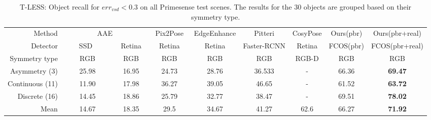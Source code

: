 \begin{sidewaystable}[t]
        \centering
        \caption{
                T-LESS: Object recall for $err_{vsd} < 0.3$ on all Primesense test scenes. The results for the $30$ objects are grouped based on their symmetry type.
        }
        \begin{tabular}{r| c c c c c c c c}
        \toprule
        Method& \multicolumn{2}{c}{AAE \cite{sundermeyer2018implicit}} & Pix2Pose \cite{park2019pix2pose}& EdgeEnhance \cite{wen2020edge}& Pitteri\cite{pitteri2019object} & CosyPose\cite{labbe2020cosypose}& Ours(pbr) & Ours(pbr+real)\\
        \cmidrule(lr){2-3}\cmidrule(lr){4-4}\cmidrule(lr){5-5}\cmidrule(lr){6-6}\cmidrule(lr){7-7}\cmidrule(lr){8-9}
        Detector&\ \ \ \ SSD\ \ \ \ \  &\ Retina\ &\ \ Retina\ \ &\ \ Retina\ \ & Faster-RCNN & Retina & FCOS(pbr) & FCOS(pbr+real)\\
        Symmetry type& RGB & RGB & RGB &RGB& RGB &RGB-D& RGB &RGB \\
        \midrule
        Asymmetry (3)&25.98&16.95&24.73&28.76&36.533&-&66.36&\textbf{69.47}\\
        Continuous (11)&11.90&17.98&36.27&39.05&46.65&-&61.52&\textbf{63.72}\\
        Discrete (16)&14.45&18.86&25.79&32.77&38.47&-&69.51&\textbf{78.02}\\
        \midrule
        Mean&14.67 &18.35 &29.5&34.67&41.27 &62.6&66.27&\textbf{71.92} \\
        \bottomrule
        \end{tabular}
\label{tab:tless_vsd}
\end{sidewaystable}

